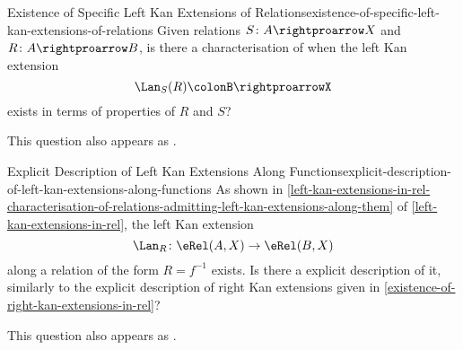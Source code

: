 \begin{question}{Existence of Specific Left Kan Extensions of Relations}{existence-of-specific-left-kan-extensions-of-relations}%
    Given relations $S\colon A\rightproarrow X$ and $R\colon A\rightproarrow B$, is there a characterisation of when the left Kan extension
    \[
        \Lan_{S}(R)%
        \colon%
        B%
        \rightproarrow%
        X%
    \]%
    exists in terms of properties of $R$ and $S$?

    This question also appears as \cite{MO461592}.
\end{question}
\begin{question}{Explicit Description of Left Kan Extensions Along Functions}{explicit-description-of-left-kan-extensions-along-functions}%
    As shown in \cref{left-kan-extensions-in-rel-characterisation-of-relations-admitting-left-kan-extensions-along-them} of \cref{left-kan-extensions-in-rel}, the left Kan extension
    \[
        \Lan_{R}%
        \colon%
        \eRel(A,X)%
        \to%
        \eRel(B,X)%
    \]%
    along a relation of the form $R=f^{-1}$ exists. Is there a explicit description of it, similarly to the explicit description of right Kan extensions given in \cref{existence-of-right-kan-extensions-in-rel}?

    This question also appears as \cite{MO461592}.
\end{question}
